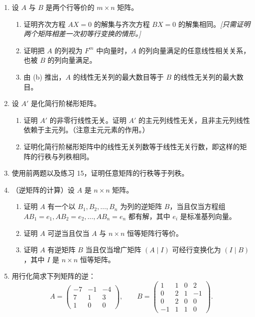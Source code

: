 \begin{enumerate}[label=\arabic*.,resume]
\begin{enumerate}[label=(\alph*)]
\item $x-2y+z=5,\quad y-2z=17,\quad 2x-3y=27$。
\item $x+y-3z+2u=2,\quad 3x-2y+5z+u=1,\quad 6x+y-4z+3u=7,\quad 2x+2y-6z=4$。
\item $x+y+4z+8u-w=-1,\quad x+2y+3z+9u-5w=-2,\quad -2y+2z-2u+v+14w=3,\quad x+4y+z+11u-13w=-4$。
\end{enumerate}
\item 设 $A$ 与 $B$ 是两个行等价的 $m\times n$ 矩阵。
\begin{enumerate}[label=(\alph*)]
\item 证明齐次方程 $AX=0$ 的解集与齐次方程 $BX=0$ 的解集相同。\emph{[只需证明两个矩阵相差一次初等行变换的情形。]}
\item 证明把 $A$ 的列视为 $F^m$ 中向量时，$A$ 的列向量满足的任意线性相关关系，也被 $B$ 的列向量满足。
\item 由 (b) 推出，$A$ 的线性无关列的最大数目等于 $B$ 的线性无关列的最大数目。
\end{enumerate}
\item 设 $A'$ 是化简行阶梯形矩阵。
\begin{enumerate}[label=(\alph*)]
\item 证明 $A'$ 的非零行线性无关。证明 $A'$ 的主元列线性无关，且非主元列线性依赖于主元列。（注意主元元素的作用。）
\item 证明化简行阶梯形矩阵中的线性无关列数等于线性无关行数，即这样的矩阵的行秩与列秩相同。
\end{enumerate}
\item 使用前两题以及练习 15，证明任意矩阵的行秩等于列秩。
\item （逆矩阵的计算）设 $A$ 是 $n\times n$ 矩阵。
\begin{enumerate}[label=(\alph*)]
\item 证明 $A$ 有一个以 $B_1,B_2,\ldots,B_n$ 为列的逆矩阵 $B$，当且仅当方程组 $AB_1=e_1,AB_2=e_2,\ldots,AB_n=e_n$ 都有解，其中 $e_i$ 是标准基列向量。
\item 证明 $A$ 可逆当且仅当 $A$ 与 $n\times n$ 恒等矩阵行等价。
\item 证明 $A$ 有逆矩阵 $B$ 当且仅当增广矩阵 $(A\mid I)$ 可经行变换化为 $(I\mid B)$，其中 $I$ 是 $n\times n$ 恒等矩阵。
\end{enumerate}
\item 用行化简求下列矩阵的逆：
\[
A=\begin{pmatrix}-7&-1&-4\\7&1&3\\1&0&0\end{pmatrix},
\qquad
B=\begin{pmatrix}1&1&0&2\\0&2&1&-1\\0&2&0&0\\-1&1&1&0\end{pmatrix}.
\]
\end{enumerate}

